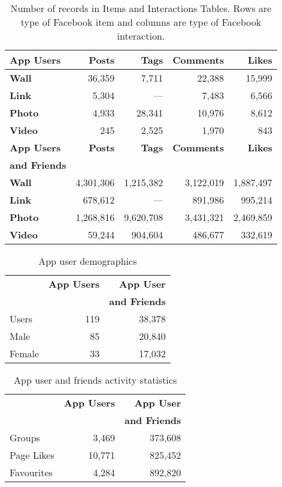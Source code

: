 \begin{table}
\centering
\begin{tabular}{|>{\small}l|>{\small}r|>{\small}r|>{\small}r|>{\small}r|}
\hline
\textbf{App Users} & \textbf{Posts} & \textbf{Tags} & \textbf{Comments} & \textbf{Likes} \\
\hline
\textbf{Wall} & 36,359 & 7,711 & 22,388 & 15,999 \\
\hline
\textbf{Link} & 5,304 & --- & 7,483 & 6,566 \\
\hline
\textbf{Photo} & 4,933 & 28,341 & 10,976 & 8,612 \\
\hline
\textbf{Video} & 245 & 2,525 & 1,970 & 843 \\
\hline
\hline
\textbf{App Users} & \textbf{Posts} & \textbf{Tags} & \textbf{Comments} & \textbf{Likes} \\
\textbf{and Friends} & & & & \\
\hline
\textbf{Wall} & 4,301,306 & 1,215,382 & 3,122,019 & 1,887,497 \\
\hline
\textbf{Link} & 678,612 & --- & 891,986 & 995,214 \\
\hline
\textbf{Photo} & 1,268,816 & 9,620,708 & 3,431,321 & 2,469,859 \\
\hline
\textbf{Video} & 59,244 & 904,604 & 486,677 & 332,619 \\
\hline
\end{tabular}
\caption{Number of records in Items and Interactions Tables. Rows are type of Facebook item and columns are type of Facebook interaction.}
\label{tab:interactions}
\end{table}


\begin{table}
\centering
\begin{tabular}{|>{\small}l|>{\small}r|>{\small}r|}
\hline
& \textbf{App Users} & \textbf{App User} \\
& & \textbf{and Friends} \\
\hline
Users & 119 & 38,378 \\
\hline
Male & 85 & 20,840 \\
\hline
Female & 33 & 17,032 \\
\hline
\end{tabular}
\caption{App user demographics}
\label{tab:demographics}
\end{table}

\begin{table}
\centering
\begin{tabular}{|>{\small}l|>{\small}r|>{\small}r|}
\hline
& \textbf{App Users} & \textbf{App User} \\
& & \textbf{and Friends} \\
\hline
Groups & 3,469 & 373,608 \\
\hline
Page Likes & 10,771 & 825,452 \\
\hline
Favourites & 4,284 & 892,820\\
\hline
\end{tabular}
\caption{App user and friends activity statistics }
\label{tab:interests}
\end{table}


